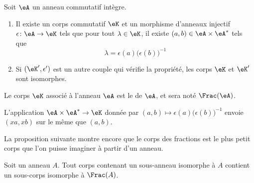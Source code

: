 \begin{theoremDef}     \label{ThogbhWgo}
    Soit \( \eA\) un anneau commutatif intègre.

    \begin{enumerate}
        \item
    Il existe un corps commutatif \( \eK\) et un morphisme d'anneaux injectif \( \epsilon\colon \eA\to \eK\) tels que pour tout \( \lambda\in\eK\), il existe \( (a,b)\in \eA\times \eA^*\) tels que
    \begin{equation}
        \lambda=\epsilon(a)\big( \epsilon(b) \big)^{-1}
    \end{equation}
\item
    Si \( (\eK',\epsilon')\) est un autre couple qui vérifie la propriété, les corps \( \eK\) et \( \eK'\) sont isomorphes.
    \end{enumerate}

    Le corps \( \eK\) associé à l'anneau \( \eA\) est le  de \( \eA\), et sera noté \( \Frac(\eA)\).
\end{theoremDef}

\begin{lemma}
    L'application \( \eA\times \eA^*\to \eK\) donnée par \( (a,b)\mapsto \epsilon(a)\big( \epsilon(b) \big)^{-1}\) envoie \( (xa,xb)\) sur le même que \( (a,b)\).
\end{lemma}

La proposition suivante montre encore que le corps des fractions est le plus petit corps que l'on puisse imaginer à partir d'un anneau.
\begin{proposition}
    Soit un anneau \( A\). Tout corps contenant un sous-anneau isomorphe à \( A\) contient un sous-corps isomorphe à \( \Frac(A)\).
\end{proposition}

